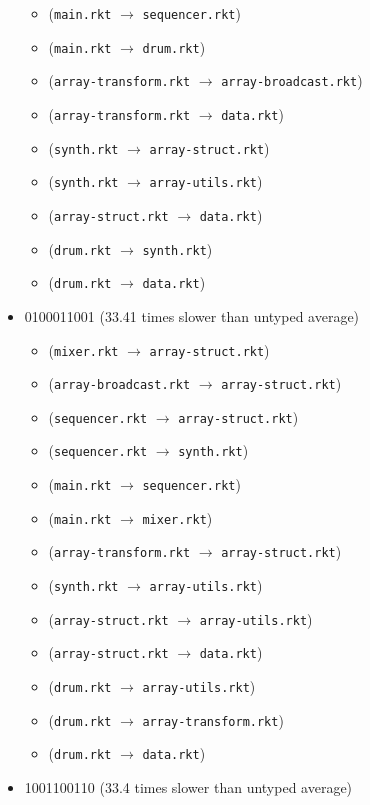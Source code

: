 \documentclass{article}
\newcommand{\mono}[1]{\texttt{#1}}
\begin{document}
\begin{itemize}
\begin{itemize}
  \item (\mono{main.rkt} $\rightarrow$ \mono{sequencer.rkt})
  \item (\mono{main.rkt} $\rightarrow$ \mono{drum.rkt})
  \item (\mono{array-transform.rkt} $\rightarrow$ \mono{array-broadcast.rkt})
  \item (\mono{array-transform.rkt} $\rightarrow$ \mono{data.rkt})
  \item (\mono{synth.rkt} $\rightarrow$ \mono{array-struct.rkt})
  \item (\mono{synth.rkt} $\rightarrow$ \mono{array-utils.rkt})
  \item (\mono{array-struct.rkt} $\rightarrow$ \mono{data.rkt})
  \item (\mono{drum.rkt} $\rightarrow$ \mono{synth.rkt})
  \item (\mono{drum.rkt} $\rightarrow$ \mono{data.rkt})
  \end{itemize}
\item 0100011001 (33.41 times slower than untyped average)
  \begin{itemize}
  \item (\mono{mixer.rkt} $\rightarrow$ \mono{array-struct.rkt})
  \item (\mono{array-broadcast.rkt} $\rightarrow$ \mono{array-struct.rkt})
  \item (\mono{sequencer.rkt} $\rightarrow$ \mono{array-struct.rkt})
  \item (\mono{sequencer.rkt} $\rightarrow$ \mono{synth.rkt})
  \item (\mono{main.rkt} $\rightarrow$ \mono{sequencer.rkt})
  \item (\mono{main.rkt} $\rightarrow$ \mono{mixer.rkt})
  \item (\mono{array-transform.rkt} $\rightarrow$ \mono{array-struct.rkt})
  \item (\mono{synth.rkt} $\rightarrow$ \mono{array-utils.rkt})
  \item (\mono{array-struct.rkt} $\rightarrow$ \mono{array-utils.rkt})
  \item (\mono{array-struct.rkt} $\rightarrow$ \mono{data.rkt})
  \item (\mono{drum.rkt} $\rightarrow$ \mono{array-utils.rkt})
  \item (\mono{drum.rkt} $\rightarrow$ \mono{array-transform.rkt})
  \item (\mono{drum.rkt} $\rightarrow$ \mono{data.rkt})
  \end{itemize}
\item 1001100110 (33.4 times slower than untyped average)

\end{itemize}
\end{document}
